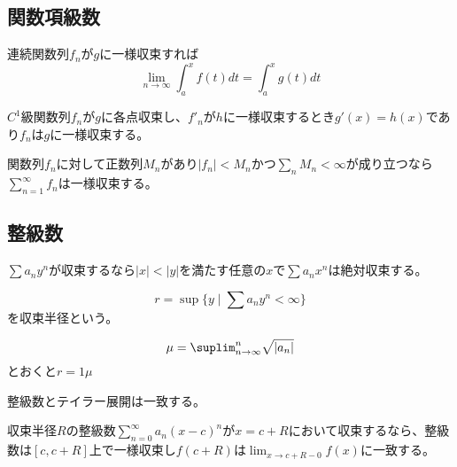 
\subsection{関数項級数}
	\begin{thm}[積分と極限の交換]
		連続関数列${f_n}$が$g$に一様収束すれば
			\[\lim_{n \to \infty} \int_a^x f(t)dt = \int_a^x g(t)dt\]
	\end{thm}
	\begin{thm}[微分と極限の交換]
		$C^1$級関数列${f_n}$が$g$に各点収束し、${f'_n}$が$h$に一様収束するとき$g'(x) = h(x)$であり${f_n}$は$g$に一様収束する。
	\end{thm}
	\begin{thm}
		関数列${f_n}$に対して正数列${M_n}$があり$|f_n| < M_n$かつ$\sum_n M_n < \infty$が成り立つなら$\sum_{n=1}^\infty f_n$は一様収束する。
	\end{thm}

\subsection{整級数}
	\begin{thm}
		$\sum a_ny^n$が収束するなら$|x| < |y|$を満たす任意の$x$で$\sum a_nx^n$は絶対収束する。
	\end{thm}
	\begin{dfn}[収束半径]
			\[r = \sup\{y \mid \sum a_ny^n < \infty\}\]
		を収束半径という。
	\end{dfn}
	\begin{thm}
			\[\mu = \suplim_{n \to \infty} ^n\sqrt{|a_n|}\]
		とおくと$r = 1\mu$
	\end{thm}
	整級数とテイラー展開は一致する。
	\begin{thm}[アーベルの連続性定理]
		収束半径$R$の整級数$\sum_{n=0}^\infty a_n(x - c)^n$が$x = c + R$において収束するなら、整級数は$[c, c + R]$上で一様収束し$f(c + R)$は$\lim_{x \to c + R - 0} f(x)$に一致する。
	\end{thm}


